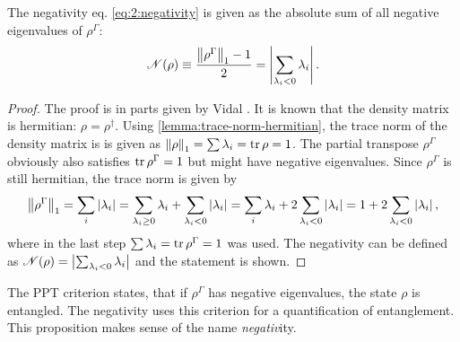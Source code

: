 \begin{proposition}\label{proposition:negativity}
  The negativity eq. \eqref{eq:2:negativity} is given as the absolute sum of all negative eigenvalues of $\rho^{\Gamma}$: 
\begin{equation}
    \mathscr{N}(\rho) \equiv \frac{\left\lVert\rho^{\Gamma}\right\rVert_1 - 1}{2} = \left\lvert\sum_{\lambda_i < 0} \lambda_i\right\rvert.
\end{equation}
\end{proposition}
\begin{proof}
  The proof is in parts given by Vidal \cite{Vidal_2001}. It is known that the density matrix is hermitian: $\rho = \rho^\dagger$. Using \cref{lemma:trace-norm-hermitian}, the trace norm of the density matrix is is given as $\left\lVert\rho\right\rVert_1=\sum \lambda_i = \tr \rho = 1$. The partial transpose $\rho^{\Gamma}$ obviously also satisfies $\tr \rho^{\Gamma} = 1$ but might have negative eigenvalues. Since $\rho^{\Gamma}$ is still hermitian, the trace norm is given by
  \begin{equation*}
    \left\lVert\rho^{\Gamma}\right\rVert_1 = \sum_i\left\lvert\lambda_i\right\rvert = \sum_{\lambda_i \ge 0} \lambda_i + \sum_{\lambda_i < 0} \left\lvert\lambda_i\right\rvert = \sum_i \lambda_i + 2\sum_{\lambda_i < 0} \left\lvert\lambda_i\right\rvert = 1 + 2\sum_{\lambda_i < 0} \left\lvert\lambda_i\right\rvert ,
  \end{equation*}
  where in the last step $\sum \lambda_i = \tr \rho^{\Gamma} = 1$ was used. The negativity can be defined as $\mathscr{N}(\rho) = \left\lvert\sum_{\lambda_i < 0} \lambda_i\right\rvert$ and the statement is shown.
\end{proof}
\begin{remark}
  The PPT criterion states, that if $\rho^{\Gamma}$ has negative eigenvalues, the state $\rho$ is entangled. The negativity uses this criterion for a quantification of entanglement. This proposition makes sense of the name \textit{negativ}ity.
\end{remark}

